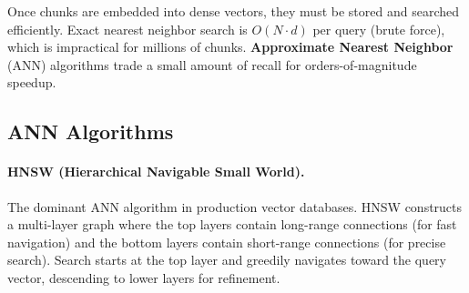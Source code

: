 Once chunks are embedded into dense vectors, they must be stored and searched
efficiently.  Exact nearest neighbor search is $O(N \cdot d)$ per query (brute
force), which is impractical for millions of chunks.  \textbf{Approximate
Nearest Neighbor} (ANN) algorithms trade a small amount of recall for
orders-of-magnitude speedup.

\subsection{ANN Algorithms}

\paragraph{HNSW (Hierarchical Navigable Small World).}
The dominant ANN algorithm in production vector databases.  HNSW constructs a
multi-layer graph where the top layers contain long-range connections (for
fast navigation) and the bottom layers contain short-range connections (for
precise search).  Search starts at the top layer and greedily navigates toward
the query vector, descending to lower layers for refinement.


